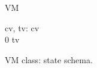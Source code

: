 \begin{figure}[H]
\centering
\begin{class}{VM}
\begin{state}
cv, tv: \integer
{} \leq  cv 
\\
0 \leq  tv 
\end{state} 
\end{class}
\caption{VM class: state schema.}
\label{oz_vm_state_schema}
\end{figure}